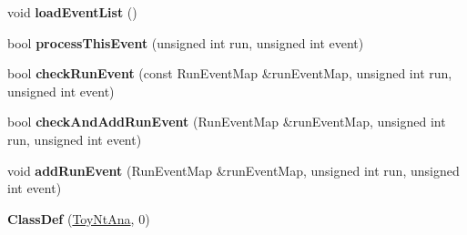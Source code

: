 \begin{DoxyCompactItemize}
\item 
\hypertarget{classToyNtAna_a275b66af1cdcf539b3fff1aa319cc321}{
void {\bfseries loadEventList} ()}
\label{classToyNtAna_a275b66af1cdcf539b3fff1aa319cc321}

\item 
\hypertarget{classToyNtAna_aa0569af1e91b31d900f01265723c3186}{
bool {\bfseries processThisEvent} (unsigned int run, unsigned int event)}
\label{classToyNtAna_aa0569af1e91b31d900f01265723c3186}

\item 
\hypertarget{classToyNtAna_a4e17cec76931d898cf17e496d41b2b47}{
bool {\bfseries checkRunEvent} (const RunEventMap \&runEventMap, unsigned int run, unsigned int event)}
\label{classToyNtAna_a4e17cec76931d898cf17e496d41b2b47}

\item 
\hypertarget{classToyNtAna_ab3e07647a3097c8a271eb58d87e5be0e}{
bool {\bfseries checkAndAddRunEvent} (RunEventMap \&runEventMap, unsigned int run, unsigned int event)}
\label{classToyNtAna_ab3e07647a3097c8a271eb58d87e5be0e}

\item 
\hypertarget{classToyNtAna_a4c19c8798efab68e678a6a9d21cb49a2}{
void {\bfseries addRunEvent} (RunEventMap \&runEventMap, unsigned int run, unsigned int event)}
\label{classToyNtAna_a4c19c8798efab68e678a6a9d21cb49a2}

\item 
\hypertarget{classToyNtAna_ae858d799c14279a31aae485ebd2c2e2e}{
{\bfseries ClassDef} (\hyperlink{classToyNtAna}{ToyNtAna}, 0)}
\label{classToyNtAna_ae858d799c14279a31aae485ebd2c2e2e}

\end{DoxyCompactItemize}
